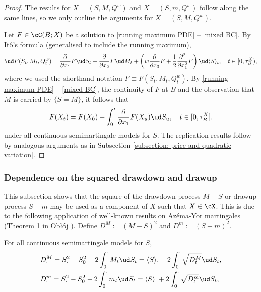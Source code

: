 \documentclass[11pt]{article}
\begin{document}
\begin{proof}

The results for $X = (S, M, Q^w)$ and $X = (S, m, Q^w)$ follow along the same lines, so we only outline the arguments for $X = (S, M, Q^w)$.

Let $F \in \cC(B;X)$ be a solution to \eqref{running maximum PDE} -- \eqref{mixed BC}. By It\^o's formula (generalised to include the running maximum),
\begin{align*}
\ud F(S_t, M_t, Q^w_t) =  \frac{\partial}{\partial x_1} F \ud S_t +  \frac{\partial}{\partial x_2}F \ud M_t + \left( w \frac{\partial}{\partial x_3}  F + \frac{1}{2}  \frac{\partial^2}{\partial x_1^2}F \right) \ud \langle S \rangle_t, \quad t \in [0,\tau^X_B),
\end{align*}
where we used the shorthand notation $F \equiv F(S_t,M_t,Q^w_t)$. By \eqref{running maximum PDE} -- \eqref{mixed BC}, the continuity of $F$ at $B$ and the observation that $M$ is carried by $\{S = M\}$, it follows that
$$
F(X_t) = F(X_0) + \int_0^t \frac{\partial}{\partial x_1} F(X_u) \ud S_u, \quad t \in [0,\tau^X_B].
$$
under all continuous semimartingale models for $S$. The replication results follow by analogous arguments as in Subsection \ref{subsection: price and quadratic variation}. 
\end{proof}

\subsubsection{Dependence on the squared drawdown and drawup}

This subsection shows that the square of the drawdown process $M - S$ or drawup process $S - m$ may be used as a component of $X$ such that $X \in \cX$. This is due to the following application of well-known results on Az\'ema-Yor martingales (Theorem 1 in Ob\l\'oj \cite{Obloj:Azema-Yor}).  Define $D^M := (M - S)^2$ and $D^m := (S - m)^2$. 

\begin{lemma}
\label{lemma: Azema-Yor}

For all continuous semimartingale models for $S$,
\begin{align}
& D^M_\cdot = S_\cdot^2 - S_0^2 - 2 \int_0^\cdot M_t \ud S_t = \langle S \rangle_\cdot - 2 \int_0^\cdot \sqrt{ D^M_t } \ud S_t,
\label{integral formulation for D^M} \\
& D^m_\cdot = S_\cdot^2 - S_0^2 - 2 \int_0^\cdot m_t \ud S_t = \langle S \rangle_\cdot + 2 \int_0^\cdot  \sqrt{ D^m_t }  \ud S_t,
\label{integral formulation for D^m}
\end{align}

\end{lemma}
\end{document}
